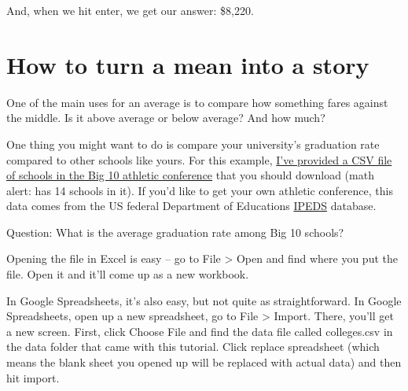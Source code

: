 \documentclass[]{book}
\begin{document}
And, when we hit enter, we get our answer: \$8,220.

\hypertarget{how-to-turn-a-mean-into-a-story}{%
\section{How to turn a mean into a story}\label{how-to-turn-a-mean-into-a-story}}

One of the main uses for an average is to compare how something fares against the middle. Is it above average or below average? And how much?

One thing you might want to do is compare your university's graduation rate compared to other schools like yours. For this example, \href{https://www.dropbox.com/s/1pcft4ib0hq8mlx/colleges.csv?dl=0}{I've provided a CSV file of schools in the Big 10 athletic conference} that you should download (math alert: has 14 schools in it). If you'd like to get your own athletic conference, this data comes from the US federal Department of Educations \href{https://nces.ed.gov/ipeds/datacenter/Default.aspx}{IPEDS} database.

Question: What is the average graduation rate among Big 10 schools?

Opening the file in Excel is easy -- go to File \textgreater{} Open and find where you put the file. Open it and it'll come up as a new workbook.

In Google Spreadsheets, it's also easy, but not quite as straightforward. In Google Spreadsheets, open up a new spreadsheet, go to File \textgreater{} Import. There, you'll get a new screen. First, click Choose File and find the data file called colleges.csv in the data folder that came with this tutorial. Click replace spreadsheet (which means the blank sheet you opened up will be replaced with actual data) and then hit import.
\end{document}
